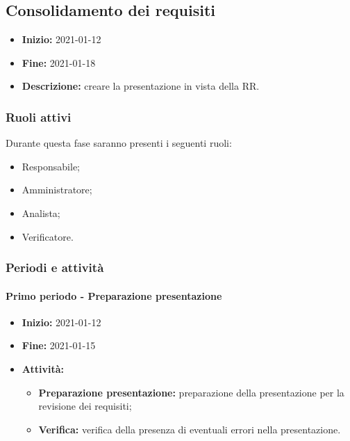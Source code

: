 
\subsection{Consolidamento dei requisiti} \label{_pianificazioneConsolidamentoDeiRequisiti}
\begin{itemize}
    \item []\textbf{Inizio:} 2021-01-12
    \item []\textbf{Fine:} 2021-01-18
    \item []\textbf{Descrizione:} creare la presentazione in vista della RR.
\end{itemize}

\subsubsection{Ruoli attivi}
Durante questa fase saranno presenti i seguenti ruoli:
\begin{itemize}
    \item Responsabile;
    \item Amministratore;
    \item Analista;
    \item Verificatore.
\end{itemize}

\subsubsection{Periodi e attività}

\paragraph[Primo periodo]{Primo periodo - \textnormal{Preparazione presentazione}}
\begin{itemize}
    \item [] \textbf{Inizio:} 2021-01-12
    \item [] \textbf{Fine:} 2021-01-15
    \item [] \textbf{Attività:}
          \begin{itemize}
              \item \textbf{Preparazione presentazione:} preparazione della presentazione per la revisione dei requisiti;
              \item \textbf{Verifica:} verifica della presenza di eventuali errori nella presentazione.
          \end{itemize}
\end{itemize}


